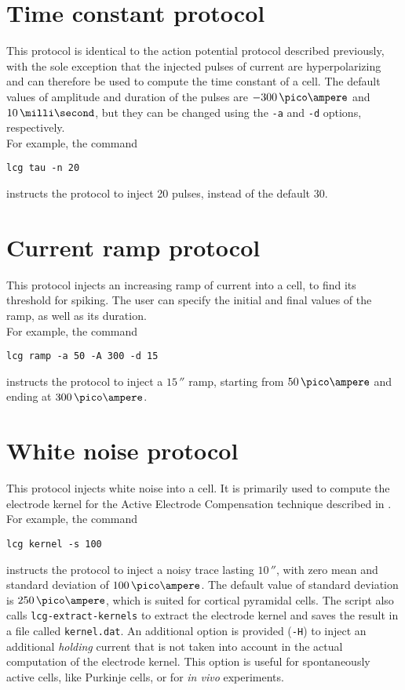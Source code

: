 \section{Time constant protocol}
This protocol is identical to the action potential protocol described
previously, with the sole exception that the injected pulses of
current are hyperpolarizing and can therefore be used to compute the
time constant of a cell. The default values of amplitude and duration
of the pulses are $-300\,\pico\ampere$ and $10\,\milli\second$, but
they can be changed using the \verb+-a+ and \verb+-d+
options, respectively. \\
For example, the command
\begin{lstlisting}
lcg tau -n 20
\end{lstlisting}
instructs the protocol to inject 20 pulses, instead of the default 30.

\section{Current ramp protocol}
This protocol injects an increasing ramp of current into a cell, to
find its threshold for spiking. The user can specify the initial and
final values of the ramp, as well as its duration.\\
For example, the command
\begin{lstlisting}
lcg ramp -a 50 -A 300 -d 15
\end{lstlisting}
instructs the protocol to inject a $15\,\second$ ramp, starting from
$50\,\pico\ampere$ and ending at $300\,\pico\ampere$.

\section{White noise protocol}
This protocol injects white noise into a cell. It is primarily used to
compute the electrode kernel for the Active Electrode Compensation
technique described in \cite{Brette:2008}.\\
For example, the command
\begin{lstlisting}
lcg kernel -s 100
\end{lstlisting}
instructs the protocol to inject a noisy trace lasting $10\,\second$,
with zero mean and standard deviation of $100\,\pico\ampere$. The
default value of standard deviation is $250\,\pico\ampere$, which is
suited for cortical pyramidal cells. The script also calls
\verb+lcg-extract-kernels+ to extract the electrode kernel and
saves the result in a file called \verb+kernel.dat+. An
additional option is provided (\verb+-H+) to inject an
additional \emph{holding} current that is not taken into account in
the actual computation of the electrode kernel. This option is useful
for spontaneously active cells, like Purkinje cells, or for \emph{in
vivo} experiments.

